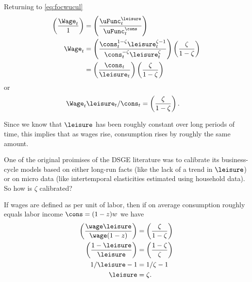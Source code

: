 Returning to \eqref{eq:focwucul}
\begin{equation}\begin{gathered}\begin{aligned}
        \left(\frac{\Wage_{t}}{1}\right) & =  \left(\frac{\uFunc^{\leisure }_{t}}{\uFunc^{\cons}_{t}}\right)
\\ \Wage_{t} & =  \left(\frac{\cons_{t}^{1-\zeta}\leisure_{t}^{\zeta-1}}{\cons_{t}^{-\zeta}\leisure^{\zeta}_{t}}\right)\left(\frac{\zeta}{1-\zeta}\right)
\\  & =  \left(\frac{\cons_{t}}{\leisure_{t}}\right)\left(\frac{\zeta}{1-\zeta}\right)
\end{aligned}\end{gathered}\end{equation}
or
\begin{equation}\begin{gathered}\begin{aligned}
        \Wage_{t}\leisure_{t}/\cons_{t} & =  \left(\frac{\zeta}{1-\zeta}\right)      . \label{eq:wlc}
\end{aligned}\end{gathered}\end{equation}


Since we know that $\leisure $ has been roughly constant over long periods
of time, this implies that as wages rise, consumption rises by roughly
the same amount.

One of the original proimises of the DSGE literature was to calibrate
its business-cycle models based on either long-run facts (like the lack
of a trend in $\leisure$) or on micro data (like intertemporal elasticities
estimated using household data).  So how is $\zeta$ calibrated?

If wages are defined as per unit of labor, then if on average consumption
roughly equals labor income $\cons = (1-z)w$ we have
\begin{equation}\begin{gathered}\begin{aligned}
        \left(\frac{\wage  \leisure}{\wage (1-z)}\right) & =  \left(\frac{\zeta}{1-\zeta}\right)  \\
        \left(\frac{1-\leisure}{\leisure }\right) & =  \left(\frac{1-\zeta}{\zeta}\right)
\\      1/\leisure - 1 & =  1/\zeta - 1
\\  \leisure & =  \zeta     .
\end{aligned}\end{gathered}\end{equation}

